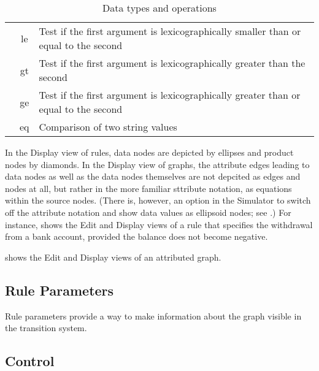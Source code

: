 \begin{table}
\begin{center}
\begin{tabular}{|c|c|l|}
  & \sf le & Test if the first argument is
  lexicographically smaller than or equal to the second \\
  & \sf gt & Test if the first argument is
  lexicographically greater than the second \\
  & \sf ge &Test if the first argument is
  lexicographically greater than or equal to the second \\
  & \sf eq & Comparison of two string values \\
\hline\hline
\end{tabular}
\end{center}
\vspace*{-\medskipamount}
\caption{Data types and operations}
\vspace*{-\medskipamount}
\end{table}

In the Display view of rules, data nodes are depicted by ellipses and product
nodes by diamonds. In the Display view of graphs, the attribute edges leading
to data nodes as well as the data nodes themselves are not depcited as edges
and nodes at all, but rather in the more familiar sttribute notation, as
equations within the source nodes. (There is, however, an option in the
Simulator to switch off the attribute notation and show data values as
ellipsoid nodes; see .) For instance,
 shows the Edit and Display views of a rule that specifies
the withdrawal from a bank account, provided the balance does not
become negative.


 shows the Edit and Display views of an attributed graph.


\subsection{Rule Parameters}

Rule parameters provide a way to make information about the graph visible in
the transition system.

\subsection{Control}


